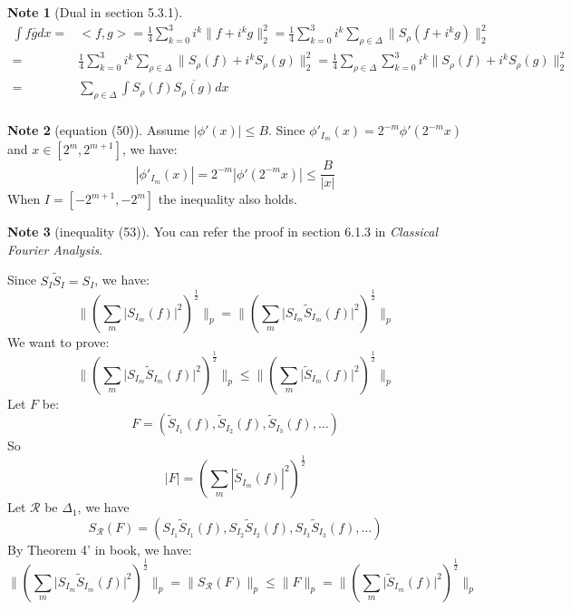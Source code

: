 \documentclass{report}
\theoremstyle{definition}
\newtheorem{note}{Note}
\theoremstyle{definition}
\theoremstyle{plain}
\numberwithin{theorem}{section}
\numberwithin{remark}{section}
\numberwithin{equation}{section}
\newcommand{\norm}[1]{\lVert#1\rVert}
\newcommand{\abs}[1]{\left\lvert#1\right\rvert}
\newcommand{\absl}[1]{\lvert#1\rvert}
\begin{document}
\begin{note}[Dual in section 5.3.1]
    \begin{align*}
        \int f\bar{g}dx=&<f,g>=\frac{1}{4}\sum_{k=0}^3 i^k\norm{f+i^kg}_2^2=\frac{1}{4}\sum_{k=0}^3 i^k\sum_{\rho\in \Delta}\norm{S_\rho(f+i^kg)}_2^2\\
        =&\frac{1}{4}\sum_{k=0}^3 i^k\sum_{\rho\in \Delta}\norm{S_\rho(f)+i^kS_{\rho}(g)}_2^2=\frac{1}{4}\sum_{\rho\in \Delta}\sum_{k=0}^3 i^k\norm{S_\rho(f)+i^kS_{\rho}(g)}_2^2\\
        =&\sum_{\rho\in \Delta} \int S_\rho(f)\overline{S_{\rho}(g)}dx\\
    \end{align*}
\end{note}
\begin{note}[equation (50)]
    Assume $\abs{\phi'(x)}\leq B$. Since $\phi'_{I_m}(x)=2^{-m}\phi'(2^{-m}x)$ and $x\in [2^m,2^{m+1}]$, we have:
\begin{equation*}
    \abs{\phi'_{I_m}(x)}=2^{-m}\abs{\phi'(2^{-m}x)}\leq \frac{B}{\abs{x}}
\end{equation*}
When $I=[-2^{m+1},-2^m]$ the inequality also holds.
\end{note}
\begin{note}[inequality (53)]
    You can refer the proof in section 6.1.3 in \emph{Classical Fourier Analysis}.\par
   Since $S_I\tilde{S}_I=S_I$, we have:
    \begin{equation*}
        \norm{( \sum_m\absl{{S}_{I_m}(f)}^2 )^\frac{1}{2}}_p=\norm{( \sum_m\absl{S_{I_m}\tilde{S}_{I_m}(f)}^2 )^\frac{1}{2}}_p
    \end{equation*}
    We want to prove:
    \begin{equation*}
        \norm{( \sum_m\absl{S_{I_m}\tilde{S}_{I_m}(f)}^2 )^\frac{1}{2}}_p\leq \norm{( \sum_m\absl{\tilde{S}_{I_m}(f)}^2 )^\frac{1}{2}}_p
    \end{equation*}
    Let $F$ be:
    \begin{equation*}
        F=(\tilde{S}_{I_1}(f),\tilde{S}_{I_2}(f),\tilde{S}_{I_3}(f),\dots)
    \end{equation*}
    So 
    \begin{equation*}
        \abs{F}=(\sum_m\abs{\tilde{S}_{I_m}(f)}^2)^\frac{1}{2}    
    \end{equation*}
    Let $\mathscr{R}$ be $\Delta_1$, we have
    \begin{equation*}
        S_{\mathscr{R}}(F)=(S_{I_1}\tilde{S}_{I_1}(f),S_{I_2}\tilde{S}_{I_2}(f),S_{I_3}\tilde{S}_{I_3}(f),\dots)
    \end{equation*}
    By Theorem 4' in book, we have:
    \begin{equation*}
        \norm{( \sum_m\absl{S_{I_m}\tilde{S}_{I_m}(f)}^2 )^\frac{1}{2}}_p=\norm{S_{\mathscr{R}}(F)}_p\leq \norm{F}_p=\norm{( \sum_m\absl{\tilde{S}_{I_m}(f)}^2 )^\frac{1}{2}}_p
    \end{equation*}
\end{note}
\end{document}
